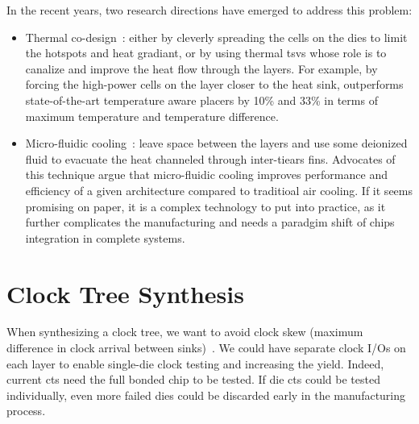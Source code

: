 \documentclass[11pt,a4paper]{report} %
\theoremstyle{customdef}
\begin{document}
In the recent years, two research directions have emerged to address this problem:
\begin{itemize}
	\item Thermal co-design~\citep{Cong2004, Cong2007, Minz2008, Ryu2011, Zhang2006}: either by cleverly spreading the cells on the dies to limit the hotspots and heat gradiant, or by using thermal \gls{tsv}s whose role is to canalize and improve the heat flow through the layers.
	For example, by forcing the high-power cells on the layer closer to the heat sink, \citet{Athikulwongse2014} outperforms state-of-the-art temperature aware placers by 10\% and 33\% in terms of maximum temperature and temperature difference.
	
	\item Micro-fluidic cooling~\citep{Koo2005, Serafy2013, Serafy2016}: leave space between the layers and use some deionized fluid to evacuate the heat channeled through inter-tiears fins.
	Advocates of this technique argue that micro-fluidic cooling improves performance and efficiency of a given architecture compared to traditioal air cooling.
	If it seems promising on paper, it is a complex technology to put into practice, as it further complicates the manufacturing and needs a paradgim shift of chips integration in complete systems.
\end{itemize}



\section{Clock Tree Synthesis}
When synthesizing a clock tree, we want to avoid clock skew (maximum difference in clock arrival between sinks)~\citep{Lu2017}.
We could have separate clock I/Os on each layer to enable single-die clock testing and increasing the yield.
Indeed, current \gls{cts} need the full bonded chip to be tested.
If die \gls{cts} could be tested individually, even more failed dies could be discarded early in the manufacturing process.
\end{document}
